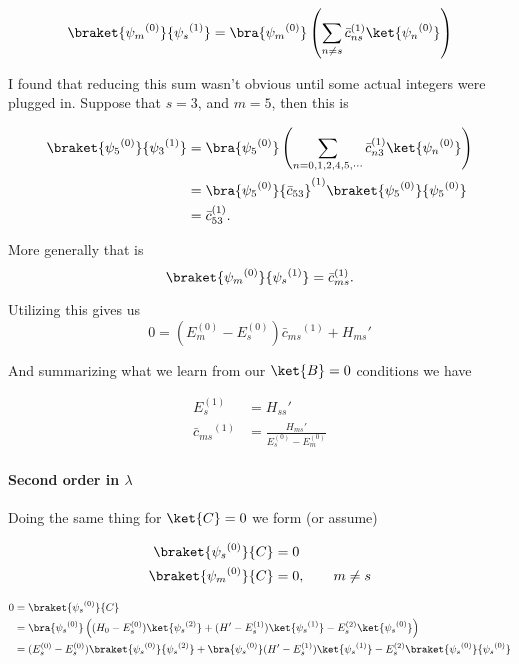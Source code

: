 \begin{align*}
\braket{{\psi_m}^{(0)}}{{\psi_s}^{(1)}} 
&=
\bra{{\psi_m}^{(0)}}
\left(
\sum_{n \ne s} {\bar{c}_{ns}}^{(1)} \ket{{\psi_n}^{(0)}}
\right) \\
\end{align*}

I found that reducing this sum wasn't obvious until some actual integers were plugged in.  Suppose that $s = 3$, and $m = 5$, then this is

\begin{align*}
\braket{{\psi_5}^{(0)}}{{\psi_3}^{(1)}} 
&=
\bra{{\psi_5}^{(0)}}
\left(
\sum_{n = 0, 1, 2, 4, 5, \cdots} {\bar{c}_{n3}}^{(1)} \ket{{\psi_n}^{(0)}}
\right) \\
&=
\bra{{\psi_5}^{(0)}}
{\bar{c}_{53}}^{(1)} \braket{{\psi_5}^{(0)}}{{\psi_5}^{(0)}} \\
&=
{\bar{c}_{53}}^{(1)}.
\end{align*}

More generally that is
\begin{equation}\label{eqn:qmTwoL4:580}
\braket{{\psi_m}^{(0)}}{{\psi_s}^{(1)}} 
=
{\bar{c}_{ms}}^{(1)}.
\end{equation}

Utilizing this gives us
\begin{equation}\label{eqn:qmTwoL4:600}
0 = 
( E_m^{(0)} - E_s^{(0)}) 
{\bar{c}_{ms}}^{(1)}
+
{H_{ms}}' 
\end{equation}

And summarizing what we learn from our $\ket{B} = 0$ conditions we have

\begin{align}\label{eqn:qmTwoL4:620}
E_s^{(1)} &= {H_{ss}}' \\
{\bar{c}_{ms}}^{(1)}
&=
\frac{{H_{ms}}' }
{ E_s^{(0)} - E_m^{(0)} }
\end{align}

\paragraph{Second order in $\lambda$}

Doing the same thing for $\ket{C} = 0$ we form (or assume)

\begin{align}\label{eqn:qmTwoL4:640}
\braket{{\psi_s}^{(0)}}{C} &= 0 \\
\braket{{\psi_m}^{(0)}}{C} &= 0, \qquad m \ne s
\end{align}

\begin{align*}
0 
&= \braket{{\psi_s}^{(0)}}{C}  \\
&=
\bra{{\psi_s}^{(0)}}
\left(
(H_0 - E_s^{(0)}) \ket{{\psi_s}^{(2)}} 
+(H' - E_s^{(1)}) \ket{{\psi_s}^{(1)}} 
-E_s^{(2)} \ket{{\psi_s}^{(0)}}  
\right) \\
&=
(E_s^{(0)} - E_s^{(0)}) 
\braket{{\psi_s}^{(0)}}{{\psi_s}^{(2)}} 
+
\bra{{\psi_s}^{(0)}}
(H' - E_s^{(1)}) \ket{{\psi_s}^{(1)}} 
-E_s^{(2)} \braket{{\psi_s}^{(0)}}{{\psi_s}^{(0)}} 
\end{align*}

